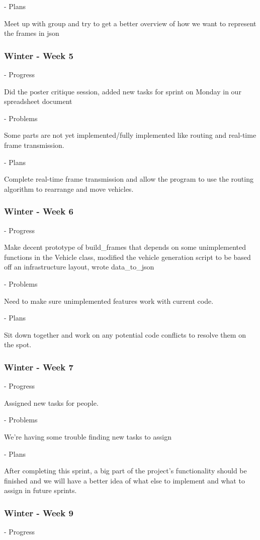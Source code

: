 \documentclass[onecolumn, draftclsnofoot,10pt, compsoc]{IEEEtran}
\begin{document}
- Plans

Meet up with group and try to get a better overview of how we want to represent the frames in json
\subsubsection{Winter - Week 5}
- Progress

Did the poster critique session, added new tasks for sprint on Monday in our spreadsheet document

- Problems

Some parts are not yet implemented/fully implemented like routing and real-time frame transmission.

- Plans

Complete real-time frame transmission and allow the program to use the routing algorithm to rearrange and move vehicles.
\subsubsection{Winter - Week 6}
- Progress

Make decent prototype of build\_frames that depends on some unimplemented functions in the Vehicle class, modified the vehicle generation script to be based off an infrastructure layout, wrote data\_to\_json

- Problems

Need to make sure unimplemented features work with current code.

- Plans

Sit down together and work on any potential code conflicts to resolve them on the spot.
\subsubsection{Winter - Week 7}
- Progress

Assigned new tasks for people.

- Problems

We're having some trouble finding new tasks to assign

- Plans

After completing this sprint, a big part of the project's functionality should be finished and we will have a better idea of what else to implement and what to assign in future sprints.
\subsubsection{Winter - Week 9}
- Progress
\end{document}

